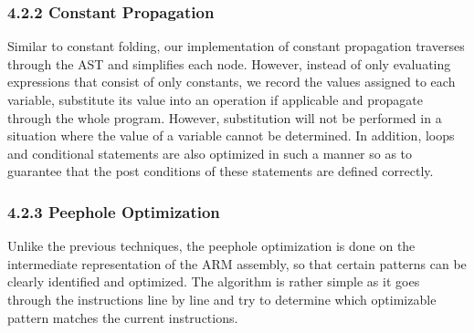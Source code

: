 \documentclass[10pt,a4paper,]{report}
\begin{document}
  \subsubsection*{4.2.2	Constant Propagation}
  Similar to constant folding, our implementation of constant propagation
  traverses through the AST and simplifies each node. However, instead of 
  only evaluating expressions that consist of only constants, we record the
  values assigned to each variable, substitute its value into an operation if
  applicable and propagate through the whole program. However, substitution will
  not be performed in a situation where the value of a variable cannot be
  determined. In addition, loops and conditional statements are also optimized
  in such a manner so as to guarantee that the post conditions of these
  statements are defined correctly.

  \subsubsection*{4.2.3	Peephole Optimization}
  Unlike the previous techniques, the peephole optimization is done on the
  intermediate representation of the ARM assembly, so that certain patterns can
  be clearly identified and optimized. The algorithm is rather simple as it goes
  through the instructions line by line and try to determine which optimizable
  pattern matches the current instructions.
\end{document}
